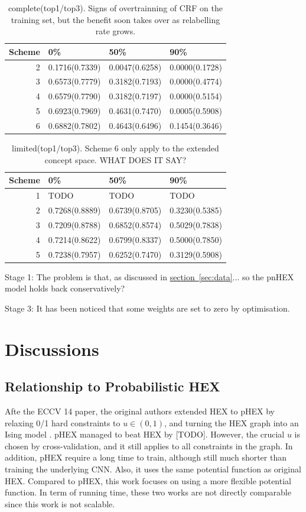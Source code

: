 \documentclass[11pt,a4paper]{article}
\begin{document}
\begin{table}[htbp]
\centering
\begin{tabular}{r|l|l|l}
Scheme & 0\% & 50\% & 90\%\\
\hline
2 & 0.1716(0.7339) & 0.0047(0.6258) & 0.0000(0.1728)\\
3 & 0.6573(0.7779) & 0.3182(0.7193) & 0.0000(0.4774)\\
4 & 0.6579(0.7790) & 0.3182(0.7197) & 0.0000(0.5154)\\
5 & 0.6923(0.7969) & 0.4631(0.7470) & 0.0005(0.5908)\\
6 & 0.6882(0.7802) & 0.4643(0.6496) & 0.1454(0.3646)
\end{tabular}
\caption{complete(top1/top3). Signs of overtrainning of CRF on the training set, but the benefit soon takes over as relabelling rate grows.}
\end{table}

\begin{table}[htbp]
\centering
\begin{tabular}{r|l|l|l}
Scheme & 0\% & 50\% & 90\%\\
\hline
1 & TODO & TODO & TODO\\
2 & 0.7268(0.8889) & 0.6739(0.8705) & 0.3230(0.5385)\\
3 & 0.7209(0.8788) & 0.6852(0.8574) & 0.5029(0.7838)\\
4 & 0.7214(0.8622) & 0.6799(0.8337) & 0.5000(0.7850)\\
5 & 0.7238(0.7957) & 0.6252(0.7470) & 0.3129(0.5908)\\
\end{tabular}
\caption{limited(top1/top3). Scheme 6 only apply to the extended concept space. WHAT DOES IT SAY?}
\end{table}

Stage 1: The problem is that, as discussed in \hyperref[sec:data]{section~\ref{sec:data}}... so the pnHEX model holds back conservatively?

Stage 3: It has been noticed that some weights are set to zero by optimisation.

\clearpage
\section{Discussions}
\subsection{Relationship to Probabilistic HEX}

Afte the ECCV 14 paper, the original authors extended HEX to pHEX by relaxing 0/1 hard constraints to $u\in(0,1)$, and turning the HEX graph into an Ising model \cite{ding2015probabilistic}. pHEX managed to beat HEX by [TODO]. However, the crucial $u$ is chosen by cross-validation, and it still applies to all constraints in the graph. In addition, pHEX require a long time to train, although still much shorter than training the underlying CNN. Also, it uses the same potential function as original HEX. Compared to pHEX, this work focuses on using a more flexible potential function. In term of running time, these two works are not directly comparable since this work is not scalable.
\end{document}
